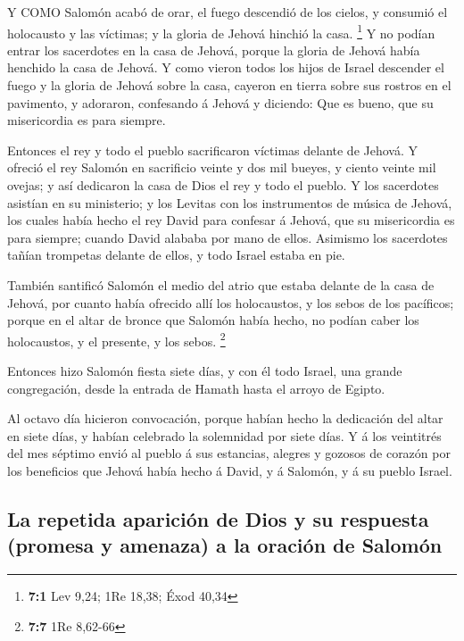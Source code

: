  Y COMO Salomón acabó de orar, el fuego descendió de los
cielos, y consumió el holocausto y las víctimas; y la gloria de Jehová
hinchió la casa. \footnote{\textbf{7:1} Lev 9,24; 1Re 18,38; Éxod 40,34}
 Y no podían entrar los sacerdotes en la casa de Jehová,
porque la gloria de Jehová había henchido la casa de Jehová.
 Y como vieron todos los hijos de Israel descender el fuego
y la gloria de Jehová sobre la casa, cayeron en tierra sobre sus rostros
en el pavimento, y adoraron, confesando á Jehová y diciendo: Que es
bueno, que su misericordia es para siempre.

 Entonces el rey y todo el pueblo sacrificaron víctimas
delante de Jehová.  Y ofreció el rey Salomón en sacrificio
veinte y dos mil bueyes, y ciento veinte mil ovejas; y así dedicaron la
casa de Dios el rey y todo el pueblo.  Y los sacerdotes
asistían en su ministerio; y los Levitas con los instrumentos de música
de Jehová, los cuales había hecho el rey David para confesar á Jehová,
que su misericordia es para siempre; cuando David alababa por mano de
ellos. Asimismo los sacerdotes tañían trompetas delante de ellos, y todo
Israel estaba en pie.

 También santificó Salomón el medio del atrio que estaba
delante de la casa de Jehová, por cuanto había ofrecido allí los
holocaustos, y los sebos de los pacíficos; porque en el altar de bronce
que Salomón había hecho, no podían caber los holocaustos, y el presente,
y los sebos. \footnote{\textbf{7:7} 1Re 8,62-66}

 Entonces hizo Salomón fiesta siete días, y con él todo
Israel, una grande congregación, desde la entrada de Hamath hasta el
arroyo de Egipto.

 Al octavo día hicieron convocación, porque habían hecho la
dedicación del altar en siete días, y habían celebrado la solemnidad por
siete días.  Y á los veintitrés del mes séptimo envió al
pueblo á sus estancias, alegres y gozosos de corazón por los beneficios
que Jehová había hecho á David, y á Salomón, y á su pueblo Israel.

\hypertarget{la-repetida-apariciuxf3n-de-dios-y-su-respuesta-promesa-y-amenaza-a-la-oraciuxf3n-de-salomuxf3n}{%
\subsection{La repetida aparición de Dios y su respuesta (promesa y
amenaza) a la oración de
Salomón}\label{la-repetida-apariciuxf3n-de-dios-y-su-respuesta-promesa-y-amenaza-a-la-oraciuxf3n-de-salomuxf3n}}

